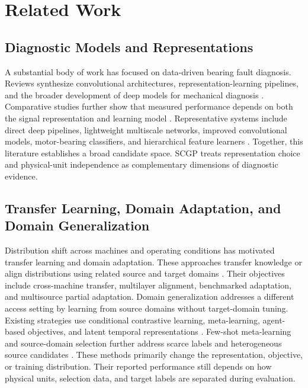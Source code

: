 \documentclass[machines,article,submit,oneauthor,pdftex]{Definitions/mdpi}
\begin{document}
\section{Related Work}

\subsection{Diagnostic Models and Representations}

A substantial body of work has focused on data-driven bearing fault diagnosis. Reviews synthesize convolutional architectures, representation-learning pipelines, and the broader development of deep models for mechanical diagnosis \cite{r04,r06,r07}. Comparative studies further show that measured performance depends on both the signal representation and learning model \cite{r05,r14}. Representative systems include direct deep pipelines, lightweight multiscale networks, improved convolutional models, motor-bearing classifiers, and hierarchical feature learners \cite{r08,r09,r10,r11,r12,r13}. Together, this literature establishes a broad candidate space. SCGP treats representation choice and physical-unit independence as complementary dimensions of diagnostic evidence.

\subsection{Transfer Learning, Domain Adaptation, and Domain Generalization}

Distribution shift across machines and operating conditions has motivated transfer learning and domain adaptation. These approaches transfer knowledge or align distributions using related source and target domains \cite{r03,r15,r16,r17,r18,r19,r23,r24}. Their objectives include cross-machine transfer, multilayer alignment, benchmarked adaptation, and multisource partial adaptation. Domain generalization addresses a different access setting by learning from source domains without target-domain tuning. Existing strategies use conditional contrastive learning, meta-learning, agent-based objectives, and latent temporal representations \cite{r20,r21,r22,r39}. Few-shot meta-learning and source-domain selection further address scarce labels and heterogeneous source candidates \cite{r36,r37,r38}. These methods primarily change the representation, objective, or training distribution. Their reported performance still depends on how physical units, selection data, and target labels are separated during evaluation.
\end{document}
